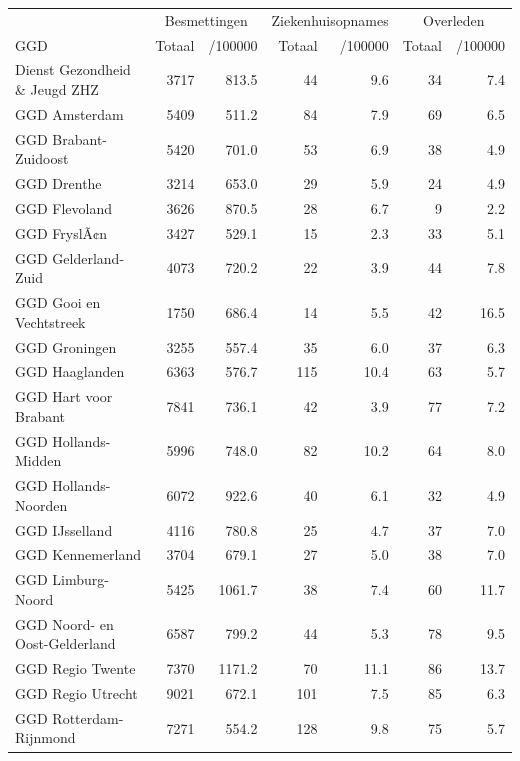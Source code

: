 \documentclass[
  english,
  man,floatsintext]{apa6}
\begin{document}
\begin{table}[H]
\centering\begingroup\fontsize{10}{12}\selectfont

\begin{threeparttable}
\begin{tabular}{lrrrrrr}
\toprule
\multicolumn{1}{c}{ } & \multicolumn{2}{c}{Besmettingen} & \multicolumn{2}{c}{Ziekenhuisopnames} & \multicolumn{2}{c}{Overleden} \\
\cmidrule(l{3pt}r{3pt}){2-3} \cmidrule(l{3pt}r{3pt}){4-5} \cmidrule(l{3pt}r{3pt}){6-7}
GGD & Totaal & /100000 & Totaal & /100000 & Totaal & /100000\\
\midrule
Dienst Gezondheid \& Jeugd ZHZ & 3717 & 813.5 & 44 & 9.6 & 34 & 7.4\\
GGD Amsterdam & 5409 & 511.2 & 84 & 7.9 & 69 & 6.5\\
GGD Brabant-Zuidoost & 5420 & 701.0 & 53 & 6.9 & 38 & 4.9\\
GGD Drenthe & 3214 & 653.0 & 29 & 5.9 & 24 & 4.9\\
GGD Flevoland & 3626 & 870.5 & 28 & 6.7 & 9 & 2.2\\
GGD FryslÃ¢n & 3427 & 529.1 & 15 & 2.3 & 33 & 5.1\\
GGD Gelderland-Zuid & 4073 & 720.2 & 22 & 3.9 & 44 & 7.8\\
GGD Gooi en Vechtstreek & 1750 & 686.4 & 14 & 5.5 & 42 & 16.5\\
GGD Groningen & 3255 & 557.4 & 35 & 6.0 & 37 & 6.3\\
GGD Haaglanden & 6363 & 576.7 & 115 & 10.4 & 63 & 5.7\\
GGD Hart voor Brabant & 7841 & 736.1 & 42 & 3.9 & 77 & 7.2\\
GGD Hollands-Midden & 5996 & 748.0 & 82 & 10.2 & 64 & 8.0\\
GGD Hollands-Noorden & 6072 & 922.6 & 40 & 6.1 & 32 & 4.9\\
GGD IJsselland & 4116 & 780.8 & 25 & 4.7 & 37 & 7.0\\
GGD Kennemerland & 3704 & 679.1 & 27 & 5.0 & 38 & 7.0\\
GGD Limburg-Noord & 5425 & 1061.7 & 38 & 7.4 & 60 & 11.7\\
GGD Noord- en Oost-Gelderland & 6587 & 799.2 & 44 & 5.3 & 78 & 9.5\\
GGD Regio Twente & 7370 & 1171.2 & 70 & 11.1 & 86 & 13.7\\
GGD Regio Utrecht & 9021 & 672.1 & 101 & 7.5 & 85 & 6.3\\
GGD Rotterdam-Rijnmond & 7271 & 554.2 & 128 & 9.8 & 75 & 5.7\\

\end{tabular}
\end{threeparttable}
\end{table}
\end{document}
